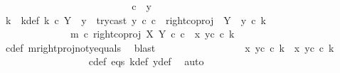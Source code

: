 \begin{isabellebody}
\isanewline
\ \ \ \ \ \ \ \ \ \ \isamarkupfalse%
\isanewline
\ \ \ \ \ \ \ \ \ \ \ \ \ \ \isamarkupfalse%
\ {\isachardoublequoteopen}c\ {\isasymnoteq}\ y{}{\isachardoublequoteclose}\ \ \ \ \ \ \ \ \ \ \ \ \ \ \isanewline
\ \ \ \ \ \ \ \ \ \ \ \ \ \ \isamarkupfalse%
\ \isamarkupfalse%
\ k{\isacharprime}{\kern0pt}\ \ k{\isacharprime}{\kern0pt}{\isacharunderscore}{\kern0pt}def{\isacharcolon}{\kern0pt}\ {\isachardoublequoteopen}k{\isacharprime}{\kern0pt}\ {\isasymin}\isactrlsub c\ Y\ {\isasymsetminus}\ {\isacharparenleft}{\kern0pt}{\isasymone}{\isacharcomma}{\kern0pt}y{}{\isacharparenright}{\kern0pt}\ {\isasymand}\ try{\isacharunderscore}{\kern0pt}cast\ y{}\ {\isasymcirc}\isactrlsub c\ c\ {\isacharequal}{\kern0pt}\ right{\isacharunderscore}{\kern0pt}coproj\ {\isasymone}\ {\isacharparenleft}{\kern0pt}Y\ {\isasymsetminus}\ {\isacharparenleft}{\kern0pt}{\isasymone}{\isacharcomma}{\kern0pt}y{}{\isacharparenright}{\kern0pt}{\isacharparenright}{\kern0pt}\ {\isasymcirc}\isactrlsub c\ k{\isacharprime}{\kern0pt}\ {\isasymand}\ \isanewline
\ \ \ \ \ \ \ \ \ \ \ \ \ \ m\ {\isasymcirc}\isactrlsub c\ right{\isacharunderscore}{\kern0pt}coproj\ X\ Y\ {\isasymcirc}\isactrlsub c\ c\ {\isacharequal}{\kern0pt}\ {\isasymlangle}x{}{\isacharcomma}{\kern0pt}\ y{}\isactrlsup c\ {\isasymcirc}\isactrlsub c\ k{\isacharprime}{\kern0pt}{\isasymrangle}{\isachardoublequoteclose}\isanewline
\ \ \ \ \ \ \ \ \ \ \ \ \ \ \ \ \isamarkupfalse%
\ c{\isacharunderscore}{\kern0pt}def\ m{\isacharunderscore}{\kern0pt}rightproj{\isacharunderscore}{\kern0pt}not{\isacharunderscore}{\kern0pt}y{}{\isacharunderscore}{\kern0pt}equals\ \isamarkupfalse%
\ blast\isanewline
\ \ \ \ \ \ \ \ \ \ \ \ \ \ \isamarkupfalse%
\ \isamarkupfalse%
\ {\isachardoublequoteopen}{\isasymlangle}x{}{\isacharcomma}{\kern0pt}\ y{}\isactrlsup c\ {\isasymcirc}\isactrlsub c\ k{\isacharprime}{\kern0pt}{\isasymrangle}\ {\isacharequal}{\kern0pt}\ {\isasymlangle}x{}{\isacharcomma}{\kern0pt}\ y{}\isactrlsup c\ {\isasymcirc}\isactrlsub c\ k{\isasymrangle}{\isachardoublequoteclose}\isanewline
\ \ \ \ \ \ \ \ \ \ \ \ \ \ \ \ \isamarkupfalse%
\ c{\isacharunderscore}{\kern0pt}def\ eqs\ k{\isacharunderscore}{\kern0pt}def\ y{\isacharunderscore}{\kern0pt}def\ \isamarkupfalse%
\ auto\isanewline
\ \ \ \ \ \ \ \ \ \ \ \ \ \ \isamarkupfalse%

\end{isabellebody}
